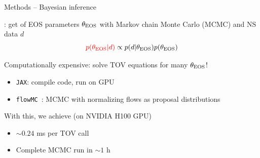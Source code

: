 \documentclass[usenames,dvipsnames,t]{beamer}
\begin{document}
\begin{frame}{Methods -- Bayesian inference}

  \def\x{6mm}
  \def\y{1mm}

  : get  of EOS parameters $\theta_{\rm{EOS}}$ with Markov chain Monte Carlo (MCMC) and NS data $d$
  \begin{equation*}
      \textcolor{red}{p(\theta_{\rm{EOS}} | d)} \propto p(d | \theta_{\rm{EOS}}) p(\theta_{\rm{EOS}})
  \end{equation*}

  Computationally expensive: solve TOV equations for many $\theta_{\rm{EOS}}$!

  \begin{itemize}
    \vspace{\y}
    \item \texttt{JAX}: compile code, run on GPU
    
    \vspace{\y}
    \item \texttt{flowMC}~\cite{Gabrie:2021tlu,Wong:2022xvh}: MCMC with normalizing flows as proposal distributions
  \end{itemize}

  \vspace{\x}

  With this, we achieve (on NVIDIA H100 GPU)
  \begin{itemize}
    \vspace{\y}
    \item $\sim 0.24$ ms per TOV call
    
    \vspace{\y}
    \item Complete MCMC run in $\sim 1$ h 
  \end{itemize}
\end{frame}
\end{document}
